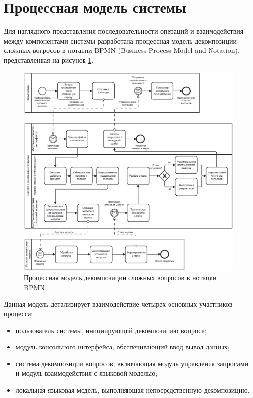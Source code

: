 \section{Процессная модель системы}

Для наглядного представления последовательности операций и взаимодействия между компонентами системы разработана процессная модель декомпозиции сложных вопросов в нотации BPMN (Business Process Model and Notation), представленная на рисунок \ref{fig:constr_bpmn}.

\begin{figure}[H]
	\centering
	\includegraphics[width=1\textwidth]{images/BPMN.pdf}
	\caption{Процессная модель декомпозиции сложных вопросов в нотации BPMN}
	\label{fig:constr_bpmn}
\end{figure}

Данная модель детализирует взаимодействие четырех основных участников процесса:
\begin{itemize}
	\item пользователь системы, инициирующий декомпозицию вопроса;
	\item модуль консольного интерфейса, обеспечивающий ввод-вывод данных;
	\item система декомпозиции вопросов, включающая модуль управления запросами и модуль взаимодействия с языковой моделью;
	\item локальная языковая модель, выполняющая непосредственную декомпозицию.
\end{itemize}

